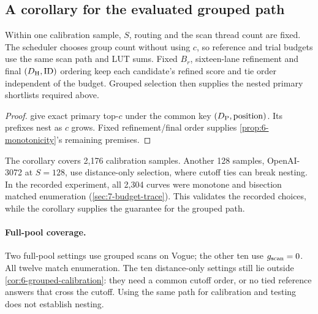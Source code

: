\subsection{A corollary for the evaluated grouped path}

Within one calibration sample, $S$, routing and the scan thread count
are fixed. The scheduler chooses group count without using $c$, so
reference and trial budgets use the same scan path and LUT sums.
Fixed $B_r$, sixteen-lane refinement and final
$(D_{\mathrm{H}},\mathrm{ID})$ ordering keep each candidate's refined
score and tie order independent of the budget. Grouped selection then
supplies the nested primary shortlists required above.

\par\addvspace{7pt}\noindent\begin{minipage}{\linewidth}
\begin{proof}
 give exact
primary top-$c$ under the common key $(D_{\mathrm{P}},\mathrm{position})$.
Its prefixes nest as $c$ grows. Fixed refinement/final order supplies \cref{prop:6-monotonicity}'s remaining premises.
\end{proof}
\end{minipage}\par\medskip
The corollary covers 2,176 calibration samples. Another 128 samples,
OpenAI-3072 at $S=128$, use distance-only selection, where cutoff ties
can break nesting. In the recorded experiment, all 2,304 curves were
monotone and bisection matched enumeration
(\cref{sec:7-budget-trace}). This validates the recorded choices, while
the corollary supplies the guarantee for the grouped path.

\paragraph{Full-pool coverage.}
Two full-pool settings use grouped scans on Vogue; the other ten use
$g_{\mathrm{scan}}=0$. All twelve match enumeration. The ten distance-only settings
still lie outside \cref{cor:6-grouped-calibration}: they need a common
cutoff order, or no tied reference answers that cross the cutoff.
Using the same path for calibration and testing does not establish nesting.

